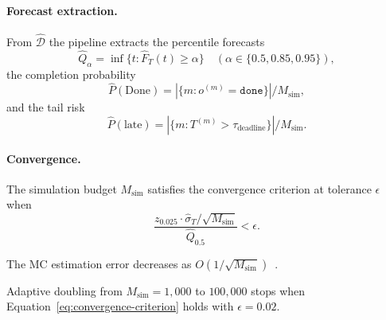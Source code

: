 \paragraph{Forecast extraction.}
From $\hat{\mathcal{D}}$ the pipeline extracts the percentile forecasts
\begin{equation}
\label{eq:percentile}
\hat{Q}_\alpha = \inf\{t : \hat{F}_T(t) \geq \alpha\}
\quad (\alpha \in \{0.5, 0.85, 0.95\}),
\end{equation}
the completion probability
\begin{equation}
\label{eq:completion-prob}
\hat{P}(\text{Done})
  = |\{m : o^{(m)} = \texttt{done}\}| / M_{\text{sim}},
\end{equation}
and the tail risk
\begin{equation}
\label{eq:tail-risk}
\hat{P}(\text{late})
  = |\{m : T^{(m)} > \tau_{\text{deadline}}\}| / M_{\text{sim}}.
\end{equation}

\paragraph{Convergence.}

\begin{definition}
\label{def:convergence}
The simulation budget $M_{\text{sim}}$ satisfies the convergence
criterion at tolerance $\epsilon$ when
\begin{equation}
\label{eq:convergence-criterion}
\frac{z_{0.025} \cdot \hat{\sigma}_T / \sqrt{M_{\text{sim}}}}
     {\hat{Q}_{0.5}} < \epsilon.
\end{equation}
\end{definition}

\begin{property}
\label{prop:convergence-rate}
The MC estimation error decreases as
$O(1/\sqrt{M_{\text{sim}}})$~\cite{robert2004monte}.
\end{property}

Adaptive doubling from $M_{\text{sim}} = 1{,}000$ to $100{,}000$
stops when Equation~\ref{eq:convergence-criterion} holds with
$\epsilon = 0.02$.
